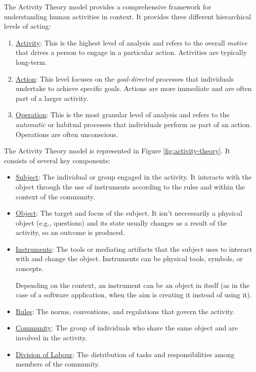 The Activity Theory model provides a comprehensive framework for understanding human activities in context. It provides three different hierarchical levels of acting:
\begin{enumerate}
    \item \ul{Activity}: This is the highest level of analysis and refers to the overall \emph{motive} that drives a person to engage in a particular action. Activities are typically long-term.
    \item \ul{Action}: This level focuses on the \emph{goal-directed} processes that individuals undertake to achieve specific goals. Actions are more immediate and are often part of a larger activity.
    \item \ul{Operation}: This is the most granular level of analysis and refers to the \emph{automatic} or habitual processes that individuals perform as part of an action. Operations are often unconscious.
\end{enumerate}

The Activity Theory model is represented in Figure \ref{fig:activity-theory}. It consists of several key components:
\begin{itemize}
    \item \ul{Subject}: The individual or group engaged in the activity. It interacts with the object through the use of instruments according to the rules and within the context of the community.
    \item \ul{Object}: The target and focus of the subject. It isn't neccessarily a physical object (e.g., questions) and its state usually changes as a result of the activity, so an outcome is produced.
    \item \ul{Instruments}: The tools or mediating artifacts that the subject uses to interact with and change the object. Instruments can be physical tools, symbols, or concepts.
    
    Depending on the context, an instrument can be an object in itself (as in the case of a software application, when the aim is creating it instead of using it).
    \item \ul{Rules}: The norms, conventions, and regulations that govern the activity.
    \item \ul{Community}: The group of individuals who share the same object and are involved in the activity. 
    \item \ul{Division of Labour}: The distribution of tasks and responsibilities among members of the community.
\end{itemize}

